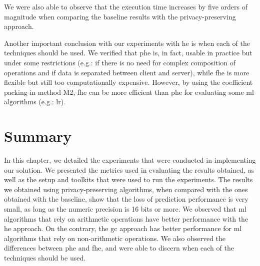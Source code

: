 We were also able to observe that the execution time increases by five orders of magnitude when comparing the baseline results with the privacy-preserving approach.

Another important conclusion with our experiments with \ac{he} is when each of the techniques should be used. We verified that \ac{phe} is, in fact, usable in practice but under some restrictions (e.g.: if there is no need for complex composition of operations and if data is separated between client and server), while \ac{fhe} is more flexible but still too computationally expensive. However, by using the coefficient packing in method M2, \ac{fhe} can be more efficient than \ac{phe} for evaluating some \ac{ml} algorithms (e.g.: \ac{lr}).





\section{Summary}
\label{sec:SummaryEvaluation}


In this chapter, we detailed the experiments that were conducted in implementing our solution.
We presented the metrics used in evaluating the results obtained, as well as the setup and toolkits that were used to run the experiments.
The results we obtained using privacy-preserving algorithms, when compared with the ones obtained with the baseline, show that the loss of prediction performance is very small, as long as the numeric precision is 16 bits or more. 
We observed that \ac{ml} algorithms that rely on arithmetic operations have better performance with the \ac{he} approach. On the contrary, the \ac{gc} approach has better performance for \ac{ml} algorithms that rely on non-arithmetic operations.
We also observed the differences between \ac{phe} and \ac{fhe}, and were able to discern when each of the techniques should be used.







